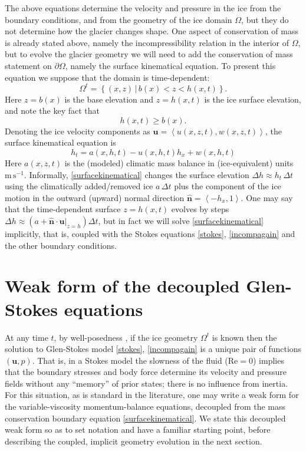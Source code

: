 \documentclass[letterpaper,final,12pt,reqno]{amsart}
\newcommand{\hbn}{\hat{\mathbf{n}}}
\newcommand{\bu}{\mathbf{u}}
\begin{document}
The above equations determine the velocity and pressure in the ice from the boundary conditions, and from the geometry of the ice domain $\Omega$, but they do not determine how the glacier changes shape.  One aspect of conservation of mass is already stated above, namely the incompressibility relation in the interior of $\Omega$, but to evolve the glacier geometry we will need to add the conservation of mass statement on $\partial\Omega$, namely the surface kinematical equation.  To present this equation we suppose that the domain is time-dependent:
\begin{equation}
\Omega^t = \left\{(x,z)\,\big|\, b(x) < z < h(x,t)\right\}.  \label{Omegat}
\end{equation}
Here $z=b(x)$ is the base elevation and $z=h(x,t)$ is the ice surface elevation, and note the key fact that
\begin{equation}
h(x,t) \ge b(x).  \label{admissibility}
\end{equation}
Denoting the ice velocity components as $\bu=\left<u(x,z,t),w(x,z,t)\right>$, the surface kinematical equation is
\begin{equation}
h_t = a(x,h,t) - u(x,h,t) h_x + w(x,h,t) \label{surfacekinematical}
\end{equation}
Here $a(x,z,t)$ is the (modeled) climatic mass balance in (ice-equivalent) units $\text{m}\,\text{s}^{-1}$.  Informally, \eqref{surfacekinematical} changes the surface elevation $\Delta h \approx h_t\,\Delta t$ using the climatically added/removed ice $a\,\Delta t$ plus the component of the ice motion in the outward (upward) normal direction $\hbn = \left<-h_x,1\right>$.  One may say that the time-dependent surface $z=h(x,t)$ evolves by steps $\Delta h \approx \left(a + \hbn\cdot \bu|_{z=h}\right) \Delta t$, but in fact we will solve \eqref{surfacekinematical} implicitly, that is, coupled with the Stokes equations \eqref{stokes}, \eqref{incompagain} and the other boundary conditions.


\section{Weak form of the decoupled Glen-Stokes equations} \label{sec:weakformstokes}

At any time $t$, by well-posedness \cite{JouvetRappaz2011}, if the ice geometry $\Omega^t$ is known then the solution to Glen-Stokes model \eqref{stokes}, \eqref{incompagain} is a unique pair of functions $(\bu,p)$.  That is, in a Stokes model the slowness of the fluid ($\text{Re}=0$) implies that the boundary stresses and body force determine its velocity and pressure fields without any ``memory'' of prior states; there is no influence from inertia.  For this situation, as is standard in the literature, one may write a weak form for the variable-viscosity momentum-balance equations, decoupled from the mass conservation boundary equation \eqref{surfacekinematical}.  We state this decoupled weak form so as to set notation and have a familiar starting point, before describing the coupled, implicit geometry evolution in the next section.
\end{document}
